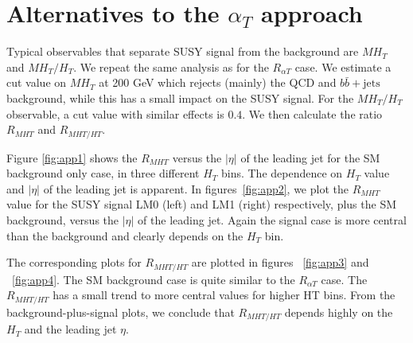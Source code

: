 \section{Alternatives to the $\alpha_{T}$ approach}

Typical observables that separate SUSY signal from the background are $MH_{T}$ and $MH_{T}/H_{T}$. We repeat the same analysis as for the $R_{\alpha T}$ case. We estimate a cut value on $MH_{T}$ at 200 GeV which rejects (mainly) the QCD and $b\bar{b} + \textrm{jets}$ background, while this has a small impact on the SUSY signal. For the $MH_{T}/H_{T}$ observable, a cut value with similar effects is $0.4$. We then calculate the ratio $R_{MHT}$ and $R_{MHT/HT}$.  

Figure \ref{fig:app1} shows the $R_{MHT}$ versus the $|\eta|$ of the leading jet for the SM background only case, in three different $H_{T}$ bins. The dependence on $H_{T}$ value and $|\eta|$ of the leading jet is apparent. In figures~\ref{fig:app2}, we plot the $R_{MHT}$ value for the SUSY signal LM0 (left) and LM1 (right) respectively, plus the SM background, versus the $|\eta|$ of the leading jet. Again the signal case is more central than the background and clearly depends on the $H_{T}$ bin. 

The corresponding plots for $R_{MHT/HT}$ are plotted in figures ~\ref{fig:app3} and ~\ref{fig:app4}. The SM background case is quite similar to the $R_{\alpha T}$ case. The $R_{MHT/HT}$ has a small trend to more central values for higher HT bins. From the background-plus-signal plots, we conclude that $R_{MHT/HT}$ depends highly on the $H_{T}$ and the leading jet $\eta$. 

